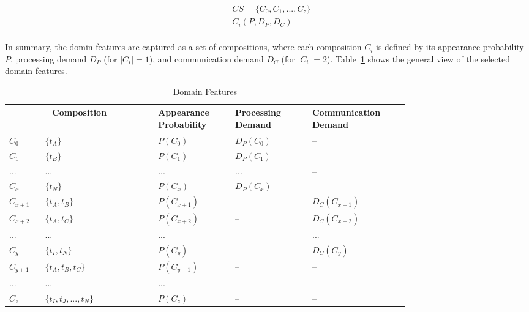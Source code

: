 \begin{equation}
\begin{split}
\label{eq:CS}
	&CS = \{C_{0}, C_{1}, ..., C_{z}\}\\
	&C_{i} (P, D_P, D_C)\\
\end{split}
\end{equation}

In summary, the domin features are captured as a set of compositions, where each composition $C_i$ is defined by its appearance probability $P$, processing demand $D_{P}$ (for $\left\vert{C_i}\right\vert = 1$), and communication demand $D_{C}$ (for $\left\vert{C_i}\right\vert = 2$).
Table~\ref{tab:feature} shows the general view of the selected domain features. 

\begin{table}[h]
	\caption{Domain Features}
	\label{tab:feature}
	\centering
	\begin{tabular}{p{0.06\linewidth}|p{0.22\linewidth}|p{0.15\linewidth}|p{0.15\linewidth}|p{0.18\linewidth}}
		\toprule
		\multicolumn{2}{c|}{Composition}& Appearance Probability& Processing Demand& Communication Demand\\
		\midrule
		\hline
		$C_{0}$&				$\{t_{A}\}$&								$P(C_{0})$&					$D_{P}(C_{0})$& --\\
		$C_{1}$& 				$\{t_{B}\}$&								$P(C_{1})$&					$D_{P}(C_{1})$& --\\
		$...$& 					$...$&									$...$&							$...$&	--\\
		$C_{x}$& 				$\{t_{N}\}$&								$P(C_{x})$&					$D_{P}(C_{x})$& --\\
		\hline
		$C_{x+1}$& 			$\{t_{A}, t_{B}\}$&					$P(C_{x+1})$&				--& $D_{C}(C_{x+1})$\\
		$C_{x+2}$& 			$\{t_{A}, t_{C}\}$&					$P(C_{x+2})$&				--& $D_{C}(C_{x+2})$\\
		$...$& 					$...$&									$...$&							--&			$...$\\
		$C_{y}$& 				$\{t_{I}, t_{N}\}$&					$P(C_{y})$&					--& $D_{C}(C_{y})$\\
		\hline
		$C_{y+1}$& 			$\{t_{A}, t_{B}, t_{C}\}$&		$P(C_{y+1})$&				--&	--\\
		$...$& 					$...$&									$...$&							--&	--\\
		$C_{z}$& 				$\{t_{I}, t_{J}, ...,t_{N}\}$&		$P(C_{z})$&					--&	--\\
		\bottomrule
	\end{tabular}
\end{table}